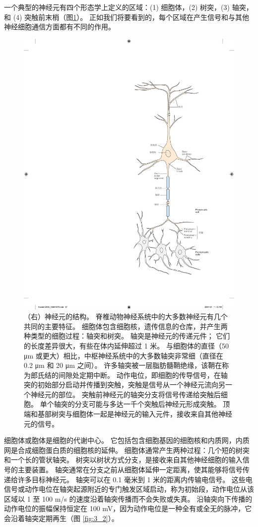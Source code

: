 一个典型的神经元有四个形态学上定义的区域：(1) 细胞体，(2) 树突，(3) 轴突，和 (4) 突触前末梢（图\ref{fig:3_1}）。 
正如我们将要看到的，每个区域在产生信号和与其他神经细胞通信方面都有不同的作用。

\begin{figure}[htbp]
	\centering
	\includegraphics[width=0.5\linewidth]{chap03/fig_3_1}
	\caption{（右）神经元的结构。 
		脊椎动物神经系统中的大多数神经元有几个共同的主要特征。 
		细胞体包含细胞核，遗传信息的仓库，并产生两种类型的细胞过程：轴突和树突。 
		轴突是神经元的传递元件； 它们的长度差异很大，有些在体内延伸超过 1 米。 
		与细胞体的直径（50 μm 或更大）相比，中枢神经系统中的大多数轴突非常细（直径在 0.2 μm 和 20 μm 之间）。 
		许多轴突被一层脂肪髓鞘绝缘，该鞘在称为郎氏结的间隙处定期中断。 
		动作电位，即细胞的传导信号，在轴突的初始部分启动并传播到突触，突触是信号从一个神经元流向另一个神经元的部位。 
		突触前神经元的轴突分支将信号传递给突触后细胞。 
		单个轴突的分支可能与多达一千个突触后神经元形成突触。 
		顶端和基部树突与细胞体一起是神经元的输入元件，接收来自其他神经元的信号。}
	\label{fig:3_1}
\end{figure}


细胞体或胞体是细胞的代谢中心。 
它包括包含细胞基因的细胞核和内质网，内质网是合成细胞蛋白质的细胞核的延伸。 
细胞体通常产生两种过程：几个短的树突和一个长的管状轴突。 
树突以树状方式分支，是接收来自其他神经细胞的输入信号的主要装置。 
轴突通常在分支之前从细胞体延伸一定距离，使其能够将信号传递给许多目标神经元。
轴突可以在 0.1 毫米到 1 米的距离内传输电信号。 
这些电信号或动作电位在轴突起源附近的专门触发区域启动，称为初始段，动作电位从该区域以 1 至 100 m/s 的速度沿着轴突传播而不会失败或失真。 
沿轴突向下传播的动作电位的振幅保持恒定在 100 mV，因为动作电位是一种全有或全无的脉冲，它会沿着轴突定期再生（图 \ref{fig:3_2}）。

